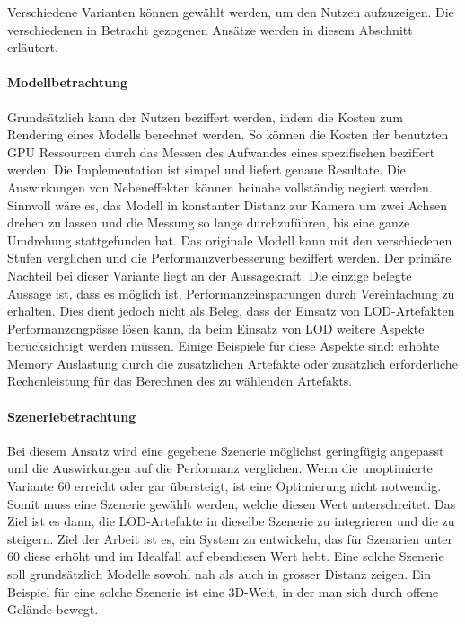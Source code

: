 Verschiedene Varianten können gewählt werden, um den Nutzen aufzuzeigen. Die verschiedenen in Betracht gezogenen Ansätze werden in diesem Abschnitt erläutert.

\paragraph{Modellbetrachtung}
Grundsätzlich kann der Nutzen beziffert werden, indem die Kosten zum Rendering eines Modells berechnet werden. So können die Kosten der benutzten GPU Ressourcen durch das Messen des Aufwandes eines spezifischen  beziffert werden. Die Implementation ist simpel und liefert genaue Resultate. Die Auswirkungen von Nebeneffekten können beinahe vollständig negiert werden.
Sinnvoll wäre es, das Modell in konstanter Distanz zur Kamera um zwei Achsen drehen zu lassen und die Messung so lange durchzuführen, bis eine ganze Umdrehung stattgefunden hat. Das originale Modell kann mit den verschiedenen Stufen verglichen und die Performanzverbesserung beziffert werden.
Der primäre Nachteil bei dieser Variante liegt an der Aussagekraft. Die einzige belegte Aussage ist, dass es möglich ist, Performanzeinsparungen durch Vereinfachung zu erhalten. Dies dient jedoch nicht als Beleg, dass der Einsatz von LOD-Artefakten Performanzengpässe lösen kann, da beim Einsatz von LOD weitere Aspekte berücksichtigt werden müssen. Einige Beispiele für diese Aspekte sind: erhöhte Memory Auslastung durch die zusätzlichen Artefakte oder zusätzlich erforderliche Rechenleistung für das Berechnen des zu wählenden Artefakts.

\paragraph{Szeneriebetrachtung}
Bei diesem Ansatz wird eine gegebene Szenerie möglichst geringfügig angepasst und die Auswirkungen auf die Performanz verglichen.
Wenn die unoptimierte Variante 60  erreicht oder gar übersteigt, ist eine Optimierung nicht notwendig. Somit muss eine Szenerie gewählt werden, welche diesen Wert unterschreitet.
Das Ziel ist es dann, die LOD-Artefakte in dieselbe Szenerie zu integrieren und die  zu steigern. Ziel der Arbeit ist es, ein System zu entwickeln, das für Szenarien unter 60  diese erhöht und im Idealfall auf ebendiesen Wert hebt.
Eine solche Szenerie soll grundsätzlich Modelle sowohl nah als auch in grosser Distanz zeigen. Ein Beispiel für eine solche Szenerie ist eine 3D-Welt, in der man sich durch offene Gelände bewegt.

